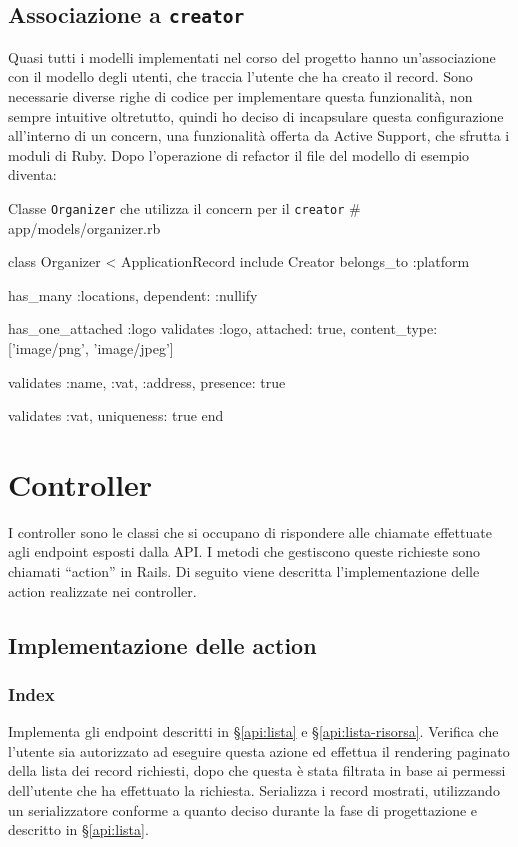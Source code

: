 \subsection{Associazione a \texttt{creator}}
Quasi tutti i modelli implementati nel corso del progetto hanno un'associazione con il modello degli utenti, che traccia l'utente che ha creato il record. Sono necessarie diverse righe di codice per implementare questa funzionalità, non sempre intuitive oltretutto, quindi ho deciso di incapsulare questa configurazione all'interno di un concern, una funzionalità offerta da Active Support, che sfrutta i moduli di Ruby. Dopo l'operazione di refactor il file del modello di esempio diventa:
\begin{code}{Classe \texttt{Organizer} che utilizza il concern per il \texttt{creator}}
# app/models/organizer.rb

class Organizer < ApplicationRecord
  include Creator
  belongs_to :platform
  
  has_many :locations, dependent: :nullify
  
  has_one_attached :logo
  validates :logo, attached: true, content_type: ['image/png', 'image/jpeg']
  
  validates :name,
            :vat,
            :address,
            presence: true

  validates :vat, uniqueness: true
end
\end{code}

\section{Controller}
I controller sono le classi che si occupano di rispondere alle chiamate effettuate agli endpoint esposti dalla API. I metodi che gestiscono queste richieste sono chiamati ``action'' in Rails. Di seguito viene descritta l'implementazione delle action realizzate nei controller.

\subsection{Implementazione delle action}
\subsubsection{Index}
Implementa gli endpoint descritti in \S \ref{api:lista} e \S \ref{api:lista-risorsa}. Verifica che l'utente sia autorizzato ad eseguire questa azione ed effettua il rendering paginato della lista dei record richiesti, dopo che questa è stata filtrata in base ai permessi dell'utente che ha effettuato la richiesta. Serializza i record mostrati, utilizzando un serializzatore conforme a quanto deciso durante la fase di progettazione e descritto in \S \ref{api:lista}.

